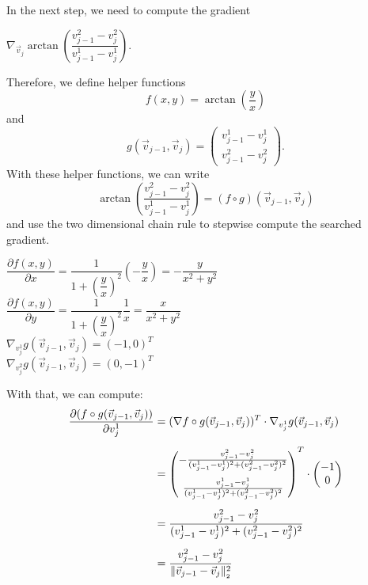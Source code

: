 \begin{proposition}
	In the next step, we need to compute the gradient 
	\begin{center}
		$
		\nabla_{\vec{v}_j} \arctan \left(\dfrac{v_{j-1}^2 - v_{j}^2}{v_{j-1}^1 - v_{j}^1} \right).
		$
	\end{center}
	
	Therefore, we define helper functions 
	$$ f(x,y) = \arctan \left( \frac{y}{x} \right)$$ 
	and 
	$$g(\vec{v}_{j-1}, \vec{v}_{j}) = \begin{pmatrix}
		v_{j-1}^1 - v_{j}^1 \\[0.5em] 
		v_{j-1}^2 - v_{j}^2
	\end{pmatrix}.$$
	With these helper functions, we can write 
	$$ \arctan\left(\frac{v_{j-1}^2 - v_{j}^2}{v_{j-1}^1 - v_{j}^1}\right) = (f \circ g) (\vec{v}_{j-1}, \vec{v}_{j}) $$
	and use the two dimensional chain rule to stepwise compute the searched gradient. 
 
	\begin{center}
		
		$\dfrac{\partial f(x,y)}{\partial x} = \dfrac{1}{1 + \left(\dfrac{y}{x}\right)^2} \left(- \dfrac{y}{x}\right) = - \dfrac{y}{x^2 + y^2}$ \\
		$\dfrac{\partial f(x,y)}{\partial y} = \dfrac{1}{1 + \left(\dfrac{y}{x}\right)^2}  \dfrac{1}{x} =  \dfrac{x}{x^2 + y^2}$ \\ [0.5em]

		$ \nabla_{v_j^1} g(\vec{v}_{j-1}, \vec{v}_{j}) = (-1, 0)^T$ \\
		$ \nabla_{v_j^2} g(\vec{v}_{j-1}, \vec{v}_{j}) = (0, -1)^T$ 
	
	\end{center}

	With that, we can compute:
	\begin{align*}
		\frac{\partial (f \circ g (\vec{v}_{j-1}, \vec{v}_j))}{\partial v_j^1} &= (\nabla f \circ g (\vec{v}_{j-1}, \vec{v}_j))^T \cdot \nabla_{v_j^1} g (\vec{v}_{j-1}, \vec{v}_j) \\[0.5em]
		&= \begin{pmatrix}
			- \frac{v_{j-1}^2 - v_{j}^2}{(v_{j-1}^1 - v_{j}^1)^2 + (v_{j-1}^2 - v_{j}^2)^2} \\[1.0em]
			\frac{v_{j-1}^1 - v_{j}^1}{(v_{j-1}^1 - v_{j}^1)^2 + (v_{j-1}^2 - v_{j}^2)^2}
		\end{pmatrix}^T
		\cdot 
		\begin{pmatrix}
			-1 \\
			0
		\end{pmatrix} \\[0.5em]
		&= \frac{v_{j-1}^2 - v_{j}^2}{(v_{j-1}^1 - v_{j}^1)^2 + (v_{j-1}^2 - v_{j}^2)^2} \\[0.5em]
		&= \frac{v_{j-1}^2 - v_{j}^2}{\norm[\vec{v}_{j-1} - \vec{v}_j]^2}
	\end{align*}


\end{proposition}
